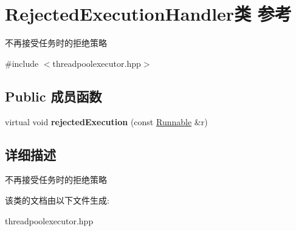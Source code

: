 \hypertarget{classRejectedExecutionHandler}{}\section{Rejected\+Execution\+Handler类 参考}
\label{classRejectedExecutionHandler}


不再接受任务时的拒绝策略  




{\ttfamily \#include $<$threadpoolexecutor.\+hpp$>$}

\subsection*{Public 成员函数}
\begin{DoxyCompactItemize}
\item 
\mbox{\label{classRejectedExecutionHandler_abb6476c7d64a7bd3111fc1a39829858b}} 
virtual void {\bfseries rejected\+Execution} (const \hyperlink{classRunnable}{Runnable} \&r)
\end{DoxyCompactItemize}


\subsection{详细描述}
不再接受任务时的拒绝策略 

该类的文档由以下文件生成\+:\begin{DoxyCompactItemize}
\item 
threadpoolexecutor.\+hpp\end{DoxyCompactItemize}
